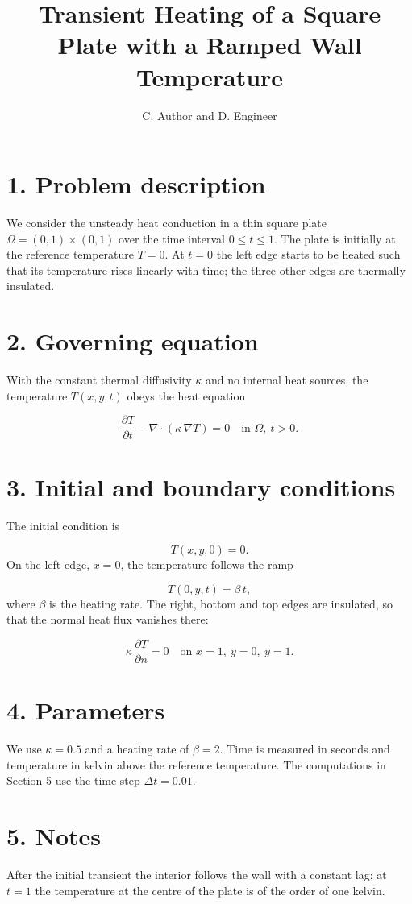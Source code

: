 \documentclass[11pt,a4paper]{article}
\title{Transient Heating of a Square Plate with a Ramped Wall Temperature}\author{C. Author and D. Engineer}\date{}
\begin{document}
\maketitle
\section*{1. Problem description}
We consider the unsteady heat conduction in a thin square plate $\Omega=(0,1)\times(0,1)$ over the time interval $0\le t\le 1$. The plate is initially at the reference temperature $T=0$. At $t=0$ the left edge starts to be heated such that its temperature rises linearly with time; the three other edges are thermally insulated.

\section*{2. Governing equation}
With the constant thermal diffusivity $\kappa$ and no internal heat sources, the temperature $T(x,y,t)$ obeys the heat equation

\begin{equation}
\frac{\partial T}{\partial t} - \nabla\cdot\left(\kappa\,\nabla T\right) = 0 \quad \text{in } \Omega,\ t>0 .
\end{equation}
\section*{3. Initial and boundary conditions}
The initial condition is

\begin{equation}
T(x,y,0) = 0 .
\end{equation}
On the left edge, $x=0$, the temperature follows the ramp

\begin{equation}
T(0,y,t) = \beta\, t ,
\end{equation}
where $\beta$ is the heating rate. The right, bottom and top edges are insulated, so that the normal heat flux vanishes there:

\begin{equation}
\kappa\,\frac{\partial T}{\partial n} = 0 \quad \text{on } x=1,\ y=0,\ y=1 .
\end{equation}
\section*{4. Parameters}
We use $\kappa=0.5$ and a heating rate of $\beta=2$. Time is measured in seconds and temperature in kelvin above the reference temperature. The computations in Section 5 use the time step $\Delta t=0.01$.

\section*{5. Notes}
After the initial transient the interior follows the wall with a constant lag; at $t=1$ the temperature at the centre of the plate is of the order of one kelvin.
\end{document}
